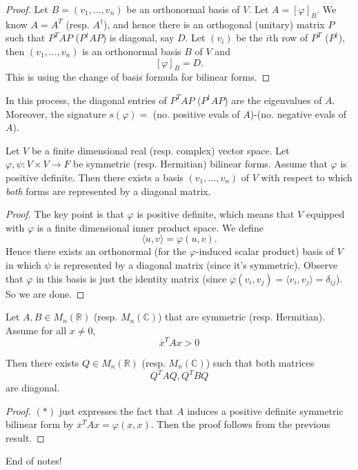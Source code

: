\documentclass[a4paper]{scrartcl}
\begin{document}
\begin{proof}
      Let $B=(v_1,\ldots ,v_n)$ be an orthonormal basis of $V$. Let $A=[\varphi]_B$. We know $A=A^T$ (resp. $A^\dagger$), and hence there is an orthogonal (unitary) matrix $P$ such that $P^TAP$ ($P^\dagger AP$) is diagonal, say $D$. Let $(v_i)$ be the $i$th row of $P^T$ ($P^\dagger$), then $(v_1,\ldots , v_n)$ is an orthonormal basis $B$ of $V$ and 
      \[[\varphi]_B=D.\]
      This is using the change of basis formula for bilinear forms.
\end{proof}

\begin{remark}
      In this process, the diagonal entries of $P^TAP$ ($P^\dagger AP$) are the eigenvalues of $A$. Moreover, the signature $s (\varphi)=$ (no. positive evals of $A$)-(no. negative evals of $A$).
\end{remark}

\begin{corollary}
     Let $V$ be a finite dimensional real (resp. complex) vector space. Let $\varphi, \psi : V \times V \rightarrow F$ be symmetric (resp. Hermitian) bilinear forms. Assume that $\varphi$ is positive definite. Then there exists a basis $(v_1, \ldots ,v_n)$ of $V$ with respect to which \emph{both} forms are represented by a diagonal matrix. 
\end{corollary}
\begin{proof}
     The key point is that $\varphi$ is positive definite, which means that $V$ equipped with $\varphi$ is a finite dimensional inner product space. We define 
     \[\langle u,v \rangle =\varphi (u,v).\]
     Hence there exists an orthonormal (for the $\varphi$-induced scalar product) basis of $V$ in which $\psi$ is represented by a diagonal matrix (since it's symmetric). Observe that $\varphi$ in this basis is just the identity matrix (since $\varphi (v_i,v_j)=\langle v_i,v_j \rangle= \delta_{ij}$). So we are done.
\end{proof}
\begin{corollary}
     Let $A,B \in M_n (\mathbb{R})$ (resp. $M_n (\mathbb{C})$) that are symmetric (resp. Hermitian). Assume for all $x \neq 0$, 
     \begin{equation}
          \overline{x} ^TAx>0 \tag{$\ast$}
     \end{equation}
     
      Then there exists $Q \in M_n (\mathbb{R})$ (resp. $M_n (\mathbb{C})$) such that both matrices 
     \[Q^TAQ, Q^TBQ\]
     are diagonal.
\end{corollary}
\begin{proof}
      $(\ast)$ just expresses the fact that $A$ induces a positive definite symmetric bilinear form by $\overline{x} ^T Ax=\varphi (x,x)$. Then the proof follows from the previous result.
\end{proof}

\begin{remark}
      End of notes!
\end{remark}
\end{document}
